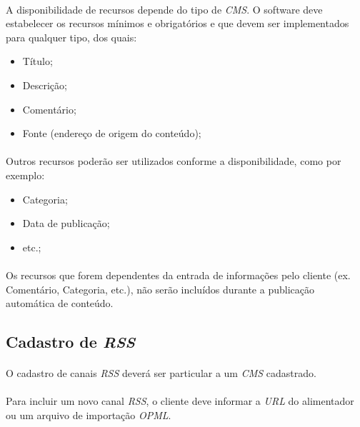 \documentclass[a4paper,12pt]{article}
\def\cms{\emph{CMS}}
\def\rss{\emph{RSS}}
\def\url{\emph{URL}}
\begin{document}
\paragraph{}
A disponibilidade de recursos depende do tipo de \cms{}. O software deve
estabelecer os recursos mínimos e obrigatórios e que devem ser implementados
para qualquer tipo, dos quais:

\begin{itemize}
\item Título;
\item Descrição;
\item Comentário;
\item Fonte (endereço de origem do conteúdo);
\end{itemize}

\paragraph{}
Outros recursos poderão ser utilizados conforme a disponibilidade, como por
exemplo:

\begin{itemize}
\item Categoria;
\item Data de publicação;
\item etc.;
\end{itemize}

\paragraph{}
Os recursos que forem dependentes da entrada de informações pelo cliente (ex.
Comentário, Categoria, etc.), não serão incluídos durante a publicação
automática de conteúdo.

\subsection{Cadastro de \rss{}}

\paragraph{}
O cadastro de canais \rss{} deverá ser particular a um \cms{} cadastrado.

\paragraph{}
Para incluir um novo canal \rss{}, o cliente deve informar a \url{} do
alimentador ou um arquivo de importação \emph{OPML}.
\end{document}
